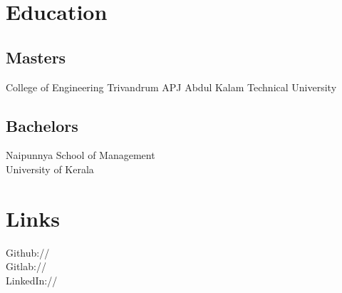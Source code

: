 \documentclass[]{resume_karuvally_openfont}
\begin{document}
%
%
\lastupdated

%
%



%
%

\begin{minipage}[t]{0.33\textwidth} 


\section{Education} 

\subsection{Masters}
College of Engineering Trivandrum
APJ Abdul Kalam Technical University
\sectionsep

\subsection{Bachelors}
Naipunnya School of Management \\
University of Kerala \\
\sectionsep


\section{Links} 
Github:// \href{https://github.com/karuvally}{} \\
Gitlab:// \href{https://gitlab.com/karuvally}{} \\
LinkedIn://  \href{https://www.linkedin.com/in/karuvally}{} \\
\sectionsep


\end{minipage}
\end{document}
